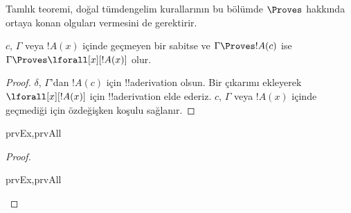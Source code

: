 



\begin{explain}
  Tamlık teoremi, doğal tümdengelim kurallarının bu bölümde $\Proves$
  hakkında ortaya konan olguları vermesini de gerektirir.
\end{explain}

\begin{thm}
 $c$, $\Gamma$ veya $!A(x)$ içinde
geçmeyen bir sabitse ve $\Gamma \Proves !A(c)$ ise
$\Gamma \Proves \lforall[x][!A(x)]$ olur.
\end{thm}

\begin{proof}
$\delta$, $\Gamma$'dan $!A(c)$ için !!a{derivation} olsun. Bir
\Intro{\lforall} çıkarımı ekleyerek $\lforall[x][!A(x)]$ için
!!a{derivation} elde ederiz. $c$, $\Gamma$ veya $!A(x)$ içinde geçmediği
için özdeğişken koşulu sağlanır.
\end{proof}

\begin{prop}
\begin{tagenumerate}{prvEx,prvAll}

\end{tagenumerate}
\end{prop}

\begin{proof}
\begin{tagenumerate}{prvEx,prvAll}

\end{tagenumerate}
\end{proof}

